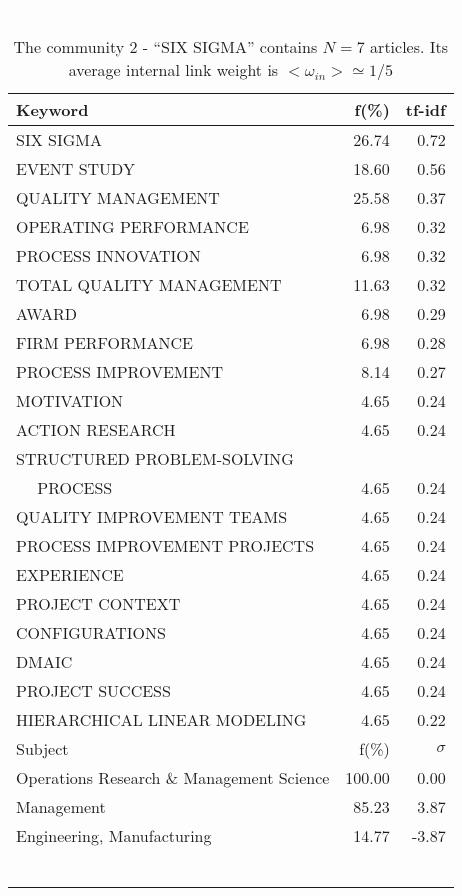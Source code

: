 \documentclass[a4paper,11pt]{report}
\begin{document}
\begin{landscape}
\clearpage

\begin{table}[!ht]
\caption{The community 2 - ``SIX SIGMA'' contains $N = 7$ articles. Its average internal link weight is $<\omega_{in}> \simeq 1/5$ }
\textcolor{white}{aa}\\
{\scriptsize\begin{tabular}{|l r  r|}
\hline
Keyword & f(\%) & tf-idf \\
\hline
SIX SIGMA & 26.74 & 0.72\\
EVENT STUDY & 18.60 & 0.56\\
QUALITY MANAGEMENT & 25.58 & 0.37\\
OPERATING PERFORMANCE & 6.98 & 0.32\\
PROCESS INNOVATION & 6.98 & 0.32\\
TOTAL QUALITY MANAGEMENT & 11.63 & 0.32\\
AWARD & 6.98 & 0.29\\
FIRM PERFORMANCE & 6.98 & 0.28\\
PROCESS IMPROVEMENT & 8.14 & 0.27\\
MOTIVATION & 4.65 & 0.24\\
ACTION RESEARCH & 4.65 & 0.24\\
STRUCTURED PROBLEM-SOLVING &  &\\
$\quad$ PROCESS & 4.65 & 0.24\\
QUALITY IMPROVEMENT TEAMS & 4.65 & 0.24\\
PROCESS IMPROVEMENT PROJECTS & 4.65 & 0.24\\
EXPERIENCE & 4.65 & 0.24\\
PROJECT CONTEXT & 4.65 & 0.24\\
CONFIGURATIONS & 4.65 & 0.24\\
DMAIC & 4.65 & 0.24\\
PROJECT SUCCESS & 4.65 & 0.24\\
HIERARCHICAL LINEAR MODELING & 4.65 & 0.22\\
\hline
\hline
Subject & f(\%) & $\sigma$\\
\hline
Operations Research \& Management Science & 100.00 & 0.00\\
Management & 85.23 & 3.87\\
Engineering, Manufacturing & 14.77 & -3.87\\
 &  & \\
 &  & \\
 &  & \\
 &  & \\
 &  & \\
 &  & \\

\end{tabular}}
\end{table}
\end{landscape}
\end{document}
